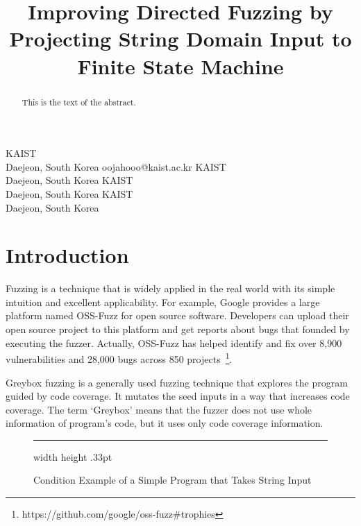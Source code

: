 \documentclass[12pt]{sigplanconf}
\begin{document}
\setlength{\pdfpageheight}{\paperheight}
\setlength{\pdfpagewidth}{\paperwidth}


\title{Improving Directed Fuzzing by Projecting String Domain Input to Finite State Machine}

{KAIST \\
    Daejeon, South Korea
}
{oojahooo@kaist.ac.kr}
{KAIST \\
    Daejeon, South Korea
}
{}
{KAIST \\
    Daejeon, South Korea
}
{}
{KAIST \\
    Daejeon, South Korea
}
{}

\maketitle

\begin{abstract}
    This is the text of the abstract.
\end{abstract}

\section{Introduction}
Fuzzing is a technique that is widely applied in the real world with its simple intuition and excellent applicability.
For example, Google provides a large platform named OSS-Fuzz for open source software. Developers can upload their open
source project to this platform and get reports about bugs that founded by executing the fuzzer. Actually, OSS-Fuzz has
helped identify and fix over 8,900 vulnerabilities and 28,000 bugs across 850 projects~\footnote{https://github.com/google/oss-fuzz\#trophies}.

Greybox fuzzing is a generally used fuzzing technique that explores the program guided by code coverage. It mutates the
seed inputs in a way that increases code coverage. The term `Greybox' means that the fuzzer does not use whole information
of program's code, but it uses only code coverage information.

\begin{figure}[h]
    \cFormat
    
    \hrule width \hsize height .33pt
    \caption{Condition Example of a Simple Program that Takes String Input}
    \label{fig:string-example}
  \end{figure}
\end{document}
